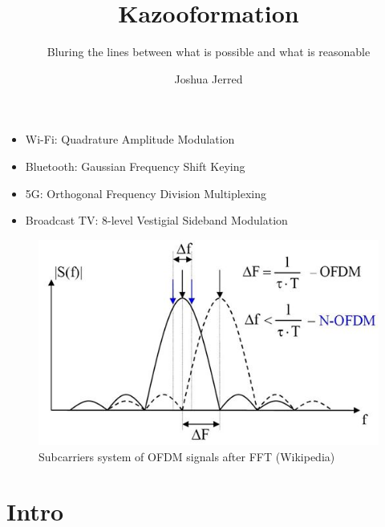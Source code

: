 \documentclass[
	11pt, %
]{beamer}
\title[Kazooformation]{Kazooformation} %
\subtitle{Bluring the lines between what is possible and what is reasonable} %
\author[Joshua Jerred]{Joshua Jerred} %
\institute[UT]{Utah Tech} %
\date[\today]{} %
\begin{document}
\begin{frame}

  \begin{itemize}
    \item Wi-Fi: Quadrature Amplitude Modulation
    \item Bluetooth: Gaussian Frequency Shift Keying
    \item 5G: Orthogonal Frequency Division Multiplexing
    \item Broadcast TV: 8-level Vestigial Sideband Modulation
  \end{itemize}

  \begin{figure}
    \includegraphics[width=0.6\linewidth]{ofdm.png}
    \caption{Subcarriers system of OFDM signals after FFT (Wikipedia)}
  \end{figure}

\end{frame}


\begin{frame}
  \titlepage %
\end{frame}


\section{Intro} %
\end{document}
